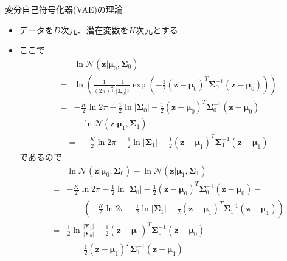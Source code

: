 \documentclass[dvipdfmx,notheorems,t]{beamer}
\begin{document}
\begin{frame}{変分自己符号化器(VAE)の理論}
\begin{itemize}
\begin{itemize}
		\item データを$D$次元、潜在変数を$K$次元とする
		
		\item ここで
		\begin{eqnarray}
			&& \ln \mathcal{N}(\bm{z} | \bm{\mu}_0, \bm{\Sigma}_0) \nonumber \\
			&=& \ln \left( \frac{1}{(2\pi)^\frac{K}{2}} \frac{1}{|\bm{\Sigma}_0|^\frac{1}{2}} \exp \left( -\frac{1}{2} \left( \bm{z} - \bm{\mu}_0 \right)^T \bm{\Sigma}_0^{-1} \left( \bm{z} - \bm{\mu}_0 \right) \right) \right) \nonumber \\
			&=& -\frac{K}{2} \ln 2\pi - \frac{1}{2} \ln |\bm{\Sigma}_0| - \frac{1}{2} \left( \bm{z} - \bm{\mu}_0 \right)^T \bm{\Sigma}_0^{-1} \left( \bm{z} - \bm{\mu}_0 \right)
		\end{eqnarray}
		\begin{eqnarray}
			&& \ln \mathcal{N}(\bm{z} | \bm{\mu}_1, \bm{\Sigma}_1) \nonumber \\
			&=& -\frac{K}{2} \ln 2\pi - \frac{1}{2} \ln |\bm{\Sigma}_1| - \frac{1}{2} \left( \bm{z} - \bm{\mu}_1 \right)^T \bm{\Sigma}_1^{-1} \left( \bm{z} - \bm{\mu}_1 \right)
		\end{eqnarray}
		であるので
		\begin{eqnarray}
			&& \ln \mathcal{N}(\bm{z} | \bm{\mu}_0, \bm{\Sigma}_0) - \ln \mathcal{N}(\bm{z} | \bm{\mu}_1, \bm{\Sigma}_1) \nonumber \\
			&=& -\frac{K}{2} \ln 2\pi - \frac{1}{2} \ln |\bm{\Sigma}_0| - \frac{1}{2} \left( \bm{z} - \bm{\mu}_0 \right)^T \bm{\Sigma}_0^{-1} \left( \bm{z} - \bm{\mu}_0 \right) - \nonumber \\
			&& \qquad \left( -\frac{K}{2} \ln 2\pi - \frac{1}{2} \ln |\bm{\Sigma}_1| - \frac{1}{2} \left( \bm{z} - \bm{\mu}_1 \right)^T \bm{\Sigma}_1^{-1} \left( \bm{z} - \bm{\mu}_1 \right) \right) \nonumber \\
			&=& \frac{1}{2} \ln \frac{|\bm{\Sigma}_1|}{|\bm{\Sigma}_0|} - \frac{1}{2} \left( \bm{z} - \bm{\mu}_0 \right)^T \bm{\Sigma}_0^{-1} \left( \bm{z} - \bm{\mu}_0 \right) + \nonumber \\
			&& \qquad \frac{1}{2} \left( \bm{z} - \bm{\mu}_1 \right)^T \bm{\Sigma}_1^{-1} \left( \bm{z} - \bm{\mu}_1 \right)
		\end{eqnarray}
		

\end{itemize}
\end{itemize}
\end{frame}
\end{document}
